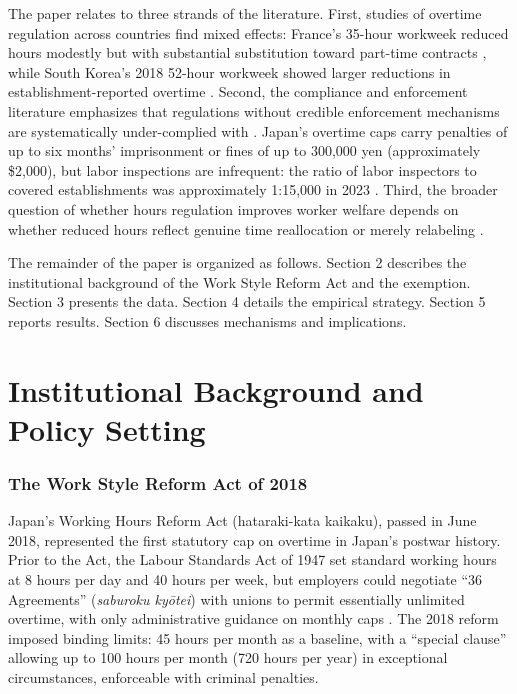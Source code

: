 \documentclass[12pt]{article}
\begin{document}
The paper relates to three strands of the literature. First, studies of overtime regulation across countries find mixed effects: France's 35-hour workweek reduced hours modestly but with substantial substitution toward part-time contracts \citep{kramarz2010}, while South Korea's 2018 52-hour workweek showed larger reductions in establishment-reported overtime \citep{lee2020}. Second, the compliance and enforcement literature emphasizes that regulations without credible enforcement mechanisms are systematically under-complied with \citep{shimada2015, ashenfelter2009}. Japan's overtime caps carry penalties of up to six months' imprisonment or fines of up to 300,000 yen (approximately \$2,000), but labor inspections are infrequent: the ratio of labor inspectors to covered establishments was approximately 1:15,000 in 2023 \citep{mhlw_report2024}. Third, the broader question of whether hours regulation improves worker welfare depends on whether reduced hours reflect genuine time reallocation or merely relabeling \citep{costa2000, goldin2014}.

The remainder of the paper is organized as follows. Section 2 describes the institutional background of the Work Style Reform Act and the exemption. Section 3 presents the data. Section 4 details the empirical strategy. Section 5 reports results. Section 6 discusses mechanisms and implications.

\section{Institutional Background and Policy Setting}

\subsubsection*{The Work Style Reform Act of 2018} Japan's Working Hours Reform Act (hataraki-kata kaikaku), passed in June 2018, represented the first statutory cap on overtime in Japan's postwar history. Prior to the Act, the Labour Standards Act of 1947 set standard working hours at 8 hours per day and 40 hours per week, but employers could negotiate ``36 Agreements'' (\textit{saburoku ky\=otei}) with unions to permit essentially unlimited overtime, with only administrative guidance on monthly caps \citep{mhlw2018}. The 2018 reform imposed binding limits: 45 hours per month as a baseline, with a ``special clause'' allowing up to 100 hours per month (720 hours per year) in exceptional circumstances, enforceable with criminal penalties.
\end{document}
